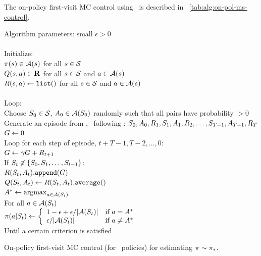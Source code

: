 The on-policy first-visit MC control using \epsgreedy\
is described in \tablename~\ref{tab:alg:on-pol-ms-control}.


\begin{table}
\beginalg
Algorithm parameters: small $\epsilon>0$\\
\\
Initialize:\\
\> $\pi(s) \in \mathcal{A}(s)$ for all $s\in\mathcal{S}$\\
\> $Q(s,a) \in \mathbf{R}$ for all $s\in\mathcal{S}$ and $a\in\mathcal{A}(s)$\\
\> $R(s, a) \leftarrow {\tt list()}$ for all $s\in\mathcal{S}$ and $a\in\mathcal{A}(s)$\\
\\
Loop: \\
\> Choose $ \in \stateset$, $ \in \actionset(\state{0})$ randomly such that all pairs have probability $> 0$\\
\> Generate an episode from \state{0}, \action{0}\ following \pol: $S_{0}, A_{0}, R_{1}, S_{1}, A_{1}, R_{2}, \ldots, S_{T-1}, A_{T-1}, R_{T}$\\
\> $G \leftarrow 0$\\
\> Loop for each step of episode, $t+T-1, T-2, \ldots, 0$:\\
\> \> $G \leftarrow \gamma G + R_{t+1}$\\
\> \> If $S_{t} \not\in \{S_{0}, S_{1}, \ldots, S_{t-1}\}$:\\
\> \> \> $R(S_{t}, A_t){\tt.append}(G)$\\
\> \> \> $Q(S_{t}, A_t) \leftarrow R(S_{t}, A_t){\tt .average()}$\\
\> \> \> $A^\ast \leftarrow \mathop{\mathrm {argmax}}_{a\in\mathcal{A}(S_{t})}$\\
\> \> \> For all $a \in \mathcal{A}(S_{t})$\\
\> \> \> \> $\pi(a|S_{t}) \leftarrow \left\{\begin{array}{ll}
1-\epsilon + \epsilon / |\mathcal{A}(S_{t})| & \mbox{if } a = A^\ast\\
\epsilon / |\mathcal{A}(S_{t})| & \mbox{if } a \neq A^\ast
\end{array}\right.$\\
Until a certain criterion is satisfied
\endalg
\caption{On-policy first-visit MC control (for \epssoft\ policies) for estimating $\pi \sim {\ensuremath{\pi}}_\ast$.}
\label{tab:alg:on-pol-ms-control}
\end{table}



